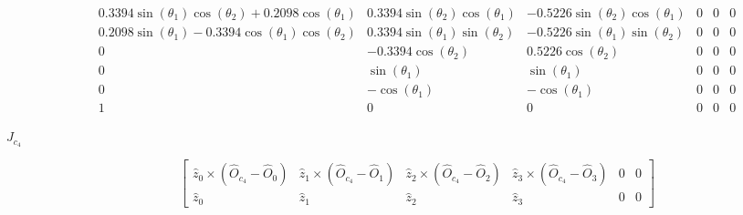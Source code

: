 \documentclass[journal]{new-aiaa}
\begin{document}
\begin{description}
    $$\begin{matrix}0.3394 \sin{\left(\theta_{1} \right)} \cos{\left(\theta_{2} \right)} + 0.2098 \cos{\left(\theta_{1} \right)} & 0.3394 \sin{\left(\theta_{2} \right)} \cos{\left(\theta_{1} \right)} & - 0.5226 \sin{\left(\theta_{2} \right)} \cos{\left(\theta_{1} \right)} & 0 & 0 & 0\\0.2098 \sin{\left(\theta_{1} \right)} - 0.3394 \cos{\left(\theta_{1} \right)} \cos{\left(\theta_{2} \right)} & 0.3394 \sin{\left(\theta_{1} \right)} \sin{\left(\theta_{2} \right)} & - 0.5226 \sin{\left(\theta_{1} \right)} \sin{\left(\theta_{2} \right)} & 0 & 0 & 0\\0 & - 0.3394 \cos{\left(\theta_{2} \right)} & 0.5226 \cos{\left(\theta_{2} \right)} & 0 & 0 & 0\\0 & \sin{\left(\theta_{1} \right)} & \sin{\left(\theta_{1} \right)} & 0 & 0 & 0\\0 & - \cos{\left(\theta_{1} \right)} & - \cos{\left(\theta_{1} \right)} & 0 & 0 & 0\\1 & 0 & 0 & 0 & 0 & 0\end{matrix}$$

    \item[$J_{c_4}$] \hfill
    $$
    \begin{bmatrix}
        \hat{z}_0 \times (\hat{O}_{c_4} - \hat{O}_0) & \hat{z}_1 \times (\hat{O}_{c_4} - \hat{O}_1) & \hat{z}_2 \times (\hat{O}_{c_4} - \hat{O}_2) & \hat{z}_3 \times (\hat{O}_{c_4} - \hat{O}_3) & 0 & 0 \\
        \hat{z}_0                                    & \hat{z}_1                                    & \hat{z}_2                                    & \hat{z}_3 & 0 & 0
    \end{bmatrix}
    $$


\end{description}
\end{document}
